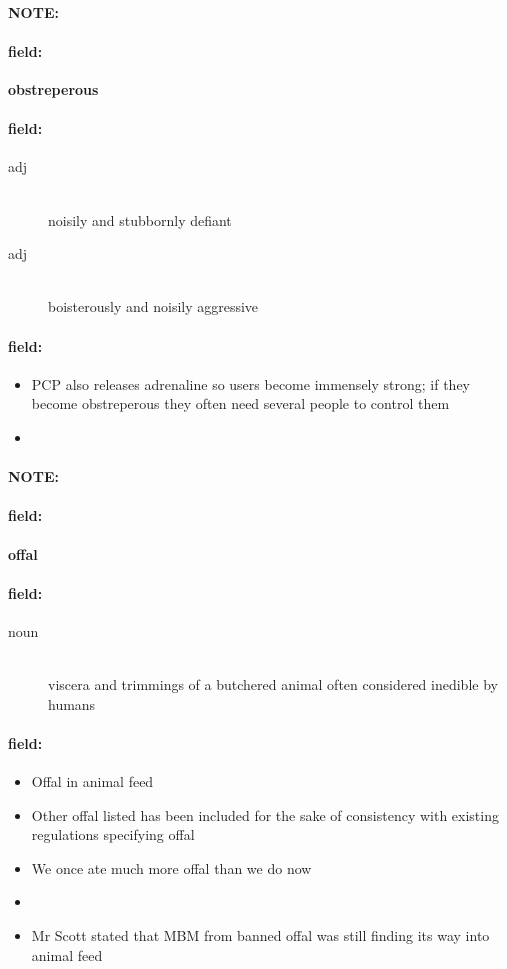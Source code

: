\documentclass[12pt]{article}
\newenvironment{note}{\paragraph{NOTE:}}{}
\newenvironment{field}{\paragraph{field:}}{}
\begin{document}
\begin{note}
\begin{field}
\textbf{\large obstreperous}
\end{field}


\begin{field}
\begin{description}
\item[adj] \hfill \\ 
noisily and stubbornly defiant

\item[adj] \hfill \\ 
boisterously and noisily aggressive

\end{description}
\end{field}

\begin{field}
\begin{itemize}
\item PCP also releases adrenaline so users become immensely strong; if they become obstreperous they often need several people to control them
\item 
\end{itemize}
\end{field}
\end{note}
\begin{note}
\begin{field}
\textbf{\large offal}
\end{field}


\begin{field}
\begin{description}
\item[noun] \hfill \\ 
viscera and trimmings of a butchered animal often considered inedible by humans

\end{description}
\end{field}

\begin{field}
\begin{itemize}
\item Offal in animal feed
\item Other offal listed has been included for the sake of consistency with existing regulations specifying offal
\item We once ate much more offal than we do now
\item 
\item Mr Scott stated that MBM from banned offal was still finding its way into animal feed
\end{itemize}
\end{field}
\end{note}
\end{document}
